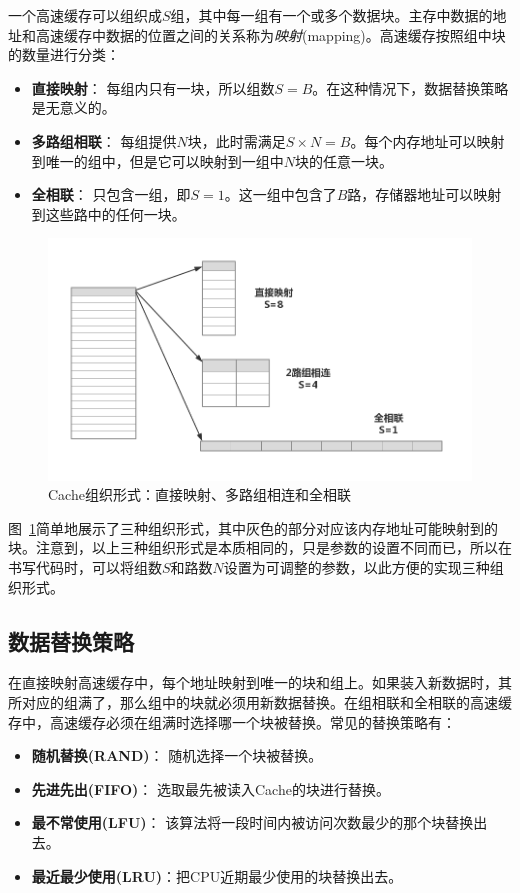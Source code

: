 \documentclass[12pt]{article} %
\begin{document}
\begin{sloppypar}
一个高速缓存可以组织成$S$组，其中每一组有一个或多个数据块。主存中数据的地址和高速缓存中数据的位置之间的关系称为{\em 映射}(mapping)。高速缓存按照组中块的数量进行分类：
\begin{itemize}
\item {\bf 直接映射}： 每组内只有一块，所以组数$S=B$。在这种情况下，数据替换策略是无意义的。
\item {\bf 多路组相联}： 每组提供$N$块，此时需满足$S\times N=B$。每个内存地址可以映射到唯一的组中，但是它可以映射到一组中$N$块的任意一块。
\item {\bf 全相联}： 只包含一组，即$S=1$。这一组中包含了$B$路，存储器地址可以映射到这些路中的任何一块。
\end{itemize}

\begin{figure}[h]
\centering
\includegraphics[width =\linewidth]{figure/Cachearch.jpg}
\caption{Cache组织形式：直接映射、多路组相连和全相联}
\label{fig:arch}
\end{figure}

图~\ref{fig:arch}简单地展示了三种组织形式，其中灰色的部分对应该内存地址可能映射到的块。注意到，以上三种组织形式是本质相同的，只是参数的设置不同而已，所以在书写代码时，可以将组数$S$和路数$N$设置为可调整的参数，以此方便的实现三种组织形式。

\subsection{数据替换策略}

在直接映射高速缓存中，每个地址映射到唯一的块和组上。如果装入新数据时，其所对应的组满了，那么组中的块就必须用新数据替换。在组相联和全相联的高速缓存中，高速缓存必须在组满时选择哪一个块被替换。常见的替换策略有：
\begin{itemize}
\item {\bf 随机替换(RAND)}： 随机选择一个块被替换。
\item {\bf 先进先出(FIFO)}： 选取最先被读入Cache的块进行替换。
\item {\bf 最不常使用(LFU)}： 该算法将一段时间内被访问次数最少的那个块替换出去。
\item {\bf 最近最少使用(LRU)}：把CPU近期最少使用的块替换出去。
\end{itemize}


\end{sloppypar}
\end{document}
